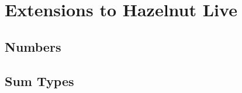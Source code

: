 \newcommand{\extensionsSec}{Extensions to Hazelnut Live}
\section{\protect\extensionsSec} %
\label{sec:extensions}

\subsection{Numbers}

%

\subsection{Sum Types}



